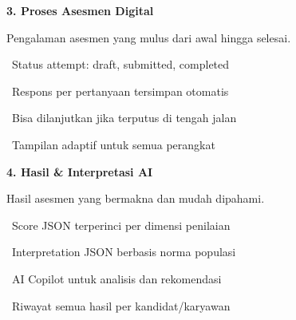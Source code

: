 \documentclass[a4paper]{article}
\begin{document}
\vspace{8pt}

\noindent
\begin{minipage}[t]{0.485\textwidth}
    \colorbox{EmeraldPrimary}{%
        \begin{minipage}{\dimexpr\textwidth-2\fboxsep\relax}
            {\fontsize{10}{13}\selectfont\bfseries\color{White} 3. Proses Asesmen Digital}
        \end{minipage}}\par
    \vspace{4pt}
    {\fontsize{9}{12}\selectfont\color{TextDark}%
    Pengalaman asesmen yang mulus dari awal hingga selesai.\par\vspace{3pt}
    \textbullet\ Status attempt: draft, submitted, completed\par\vspace{2pt}%
    \textbullet\ Respons per pertanyaan tersimpan otomatis\par\vspace{2pt}%
    \textbullet\ Bisa dilanjutkan jika terputus di tengah jalan\par\vspace{2pt}%
    \textbullet\ Tampilan adaptif untuk semua perangkat}%
\end{minipage}%
\hfill
\begin{minipage}[t]{0.485\textwidth}
    \colorbox{PurplePrimary}{%
        \begin{minipage}{\dimexpr\textwidth-2\fboxsep\relax}
            {\fontsize{10}{13}\selectfont\bfseries\color{White} 4. Hasil \& Interpretasi AI}
        \end{minipage}}\par
    \vspace{4pt}
    {\fontsize{9}{12}\selectfont\color{TextDark}%
    Hasil asesmen yang bermakna dan mudah dipahami.\par\vspace{3pt}
    \textbullet\ Score JSON terperinci per dimensi penilaian\par\vspace{2pt}%
    \textbullet\ Interpretation JSON berbasis norma populasi\par\vspace{2pt}%
    \textbullet\ AI Copilot untuk analisis dan rekomendasi\par\vspace{2pt}%
    \textbullet\ Riwayat semua hasil per kandidat/karyawan}%
\end{minipage}
\end{document}
